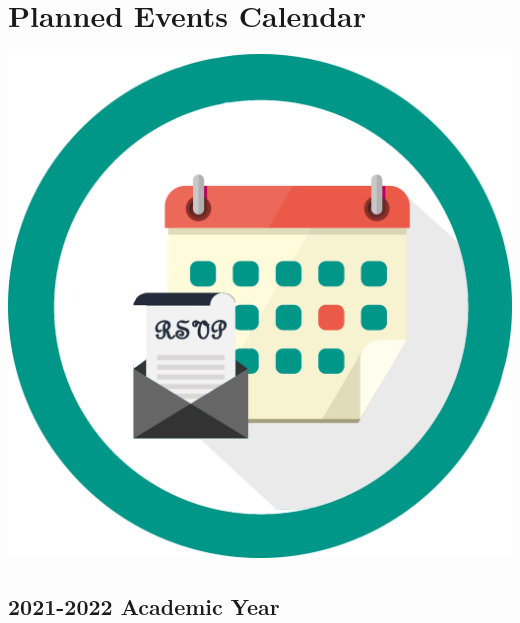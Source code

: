 \documentclass[
  openany]{book}
\begin{document}
\hypertarget{timeline}{%
\chapter{Planned Events Calendar}\label{timeline}}

\includegraphics{images/calendar.png}

\hypertarget{fall19}{%
\section{2021-2022 Academic Year}\label{fall19}}
\end{document}
